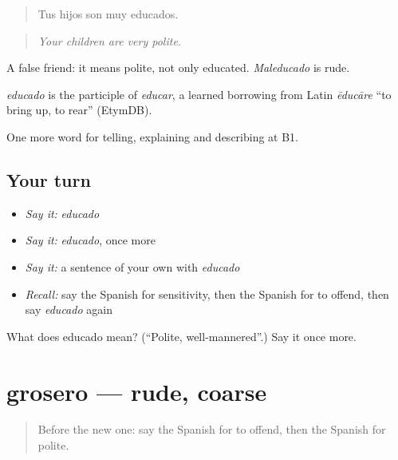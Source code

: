 \begin{quote}
Tus hijos son muy educados.
\end{quote}

\begin{quote}
\emph{Your children are very polite.}
\end{quote}

A false friend: it means polite, not only educated. \emph{Maleducado} is rude.

\begin{cousinweb}
\emph{educado} is the participle of \emph{educar}, a learned borrowing from Latin \emph{ēducāre} \textquotedblleft{}to bring up, to rear\textquotedblright{} (EtymDB).
\end{cousinweb}

\begin{grammarlens}[title={What you've built}]
One more word for telling, explaining and describing at B1.
\end{grammarlens}

\subsection*{Your turn}
\begin{itemize}
\raggedright
  \item \emph{Say it:} \emph{educado}
  \item \emph{Say it:} \emph{educado}, once more
  \item \emph{Say it:} a sentence of your own with \emph{educado}
  \item \emph{Recall:} say the Spanish for sensitivity, then the Spanish for to offend, then say \emph{educado} again
\end{itemize}

\begin{tcolorbox}[breakable,colback=teal!4,colframe=teal!35!black,title={Before you move on}]
What does educado mean? (\textquotedblleft{}Polite, well-mannered\textquotedblright{}.) Say it once more.
\end{tcolorbox}
\section[grosero]{grosero — rude, coarse}

\label{lesson:ES-C727-grosero}



\begin{quote}
Before the new one: say the Spanish for to offend, then the Spanish for polite.
\end{quote}


